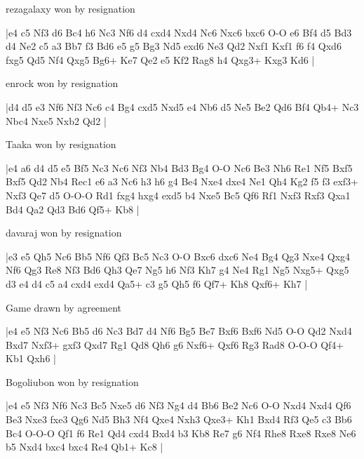 \showboard

rezagalaxy won by resignation

\makegametitle
|e4 c5 Nf3 d6 Bc4 h6 Nc3 Nf6 d4 cxd4 Nxd4 Nc6 Nxc6 bxc6 O-O e6 Bf4 d5 Bd3 d4 Ne2 c5 a3 Bb7 f3 Bd6 e5 g5 Bg3 Nd5 exd6 Ne3 Qd2 Nxf1 Kxf1 f6 f4 Qxd6 fxg5 Qd5 Nf4 Qxg5 Bg6+ Ke7 Qe2 e5 Kf2 Rag8 h4 Qxg3+ Kxg3 Kd6  |

\showboard

enrock won by resignation

\makegametitle
|d4 d5 e3 Nf6 Nf3 Nc6 c4 Bg4 cxd5 Nxd5 e4 Nb6 d5 Ne5 Be2 Qd6 Bf4 Qb4+ Nc3 Nbc4 Nxe5 Nxb2 Qd2  |

\showboard

Taaka won by resignation

\makegametitle
|e4 a6 d4 d5 e5 Bf5 Nc3 Nc6 Nf3 Nb4 Bd3 Bg4 O-O Nc6 Be3 Nh6 Re1 Nf5 Bxf5 Bxf5 Qd2 Nb4 Rec1 e6 a3 Nc6 h3 h6 g4 Be4 Nxe4 dxe4 Ne1 Qh4 Kg2 f5 f3 exf3+ Nxf3 Qe7 d5 O-O-O Rd1 fxg4 hxg4 exd5 b4 Nxe5 Bc5 Qf6 Rf1 Nxf3 Rxf3 Qxa1 Bd4 Qa2 Qd3 Bd6 Qf5+ Kb8  |

\showboard

davaraj won by resignation

\makegametitle
|e3 e5 Qh5 Nc6 Bb5 Nf6 Qf3 Bc5 Nc3 O-O Bxc6 dxc6 Ne4 Bg4 Qg3 Nxe4 Qxg4 Nf6 Qg3 Re8 Nf3 Bd6 Qh3 Qe7 Ng5 h6 Nf3 Kh7 g4 Ne4 Rg1 Ng5 Nxg5+ Qxg5 d3 e4 d4 c5 a4 cxd4 exd4 Qa5+ c3 g5 Qh5 f6 Qf7+ Kh8 Qxf6+ Kh7  |

\showboard

Game drawn by agreement

\makegametitle
|e4 e5 Nf3 Nc6 Bb5 d6 Nc3 Bd7 d4 Nf6 Bg5 Be7 Bxf6 Bxf6 Nd5 O-O Qd2 Nxd4 Bxd7 Nxf3+ gxf3 Qxd7 Rg1 Qd8 Qh6 g6 Nxf6+ Qxf6 Rg3 Rad8 O-O-O Qf4+ Kb1 Qxh6  |

\showboard

Bogoliubon won by resignation

\makegametitle
|e4 e5 Nf3 Nf6 Nc3 Bc5 Nxe5 d6 Nf3 Ng4 d4 Bb6 Be2 Nc6 O-O Nxd4 Nxd4 Qf6 Be3 Nxe3 fxe3 Qg6 Nd5 Bh3 Nf4 Qxe4 Nxh3 Qxe3+ Kh1 Bxd4 Rf3 Qe5 c3 Bb6 Bc4 O-O-O Qf1 f6 Re1 Qd4 cxd4 Bxd4 b3 Kb8 Re7 g6 Nf4 Rhe8 Rxe8 Rxe8 Ne6 b5 Nxd4 bxc4 bxc4 Re4 Qb1+ Kc8  |

